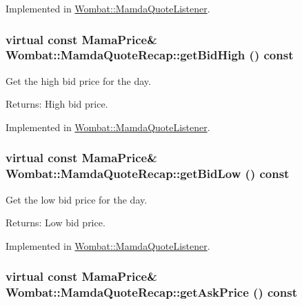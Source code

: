Implemented in \hyperlink{classWombat_1_1MamdaQuoteListener_e1cbe538d859cde30b322ca78616df43}{Wombat::Mamda\-Quote\-Listener}.\hypertarget{classWombat_1_1MamdaQuoteRecap_c8ebabdee903b477922310050931ced6}{
\subsubsection[getBidHigh]{\setlength{\rightskip}{0pt plus 5cm}virtual const Mama\-Price\& Wombat::Mamda\-Quote\-Recap::get\-Bid\-High () const}}
\label{classWombat_1_1MamdaQuoteRecap_c8ebabdee903b477922310050931ced6}


Get the high bid price for the day. 

\begin{Desc}
\item[Returns:]High bid price. \end{Desc}


Implemented in \hyperlink{classWombat_1_1MamdaQuoteListener_3f80653343c9fef6d788cf0ab4e33de7}{Wombat::Mamda\-Quote\-Listener}.\hypertarget{classWombat_1_1MamdaQuoteRecap_8ee3dce6e5aab4ef5219e3bacb98798d}{
\subsubsection[getBidLow]{\setlength{\rightskip}{0pt plus 5cm}virtual const Mama\-Price\& Wombat::Mamda\-Quote\-Recap::get\-Bid\-Low () const}}
\label{classWombat_1_1MamdaQuoteRecap_8ee3dce6e5aab4ef5219e3bacb98798d}


Get the low bid price for the day. 

\begin{Desc}
\item[Returns:]Low bid price. \end{Desc}


Implemented in \hyperlink{classWombat_1_1MamdaQuoteListener_8e61cef3c5d211789ec168c0d8866f18}{Wombat::Mamda\-Quote\-Listener}.\hypertarget{classWombat_1_1MamdaQuoteRecap_c2eadf54aa31c75012df3101c8200861}{
\subsubsection[getAskPrice]{\setlength{\rightskip}{0pt plus 5cm}virtual const Mama\-Price\& Wombat::Mamda\-Quote\-Recap::get\-Ask\-Price () const}}
\label{classWombat_1_1MamdaQuoteRecap_c2eadf54aa31c75012df3101c8200861}


